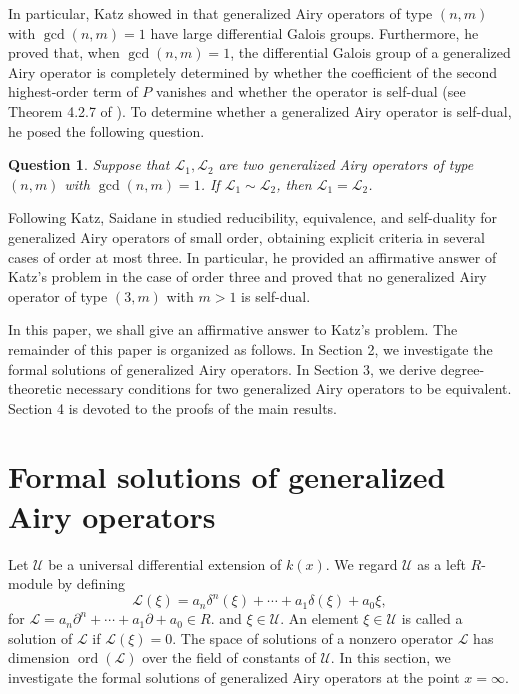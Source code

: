 \documentclass{article}
\newtheorem{question}[theorem]{Question}
\DeclareMathOperator{\ord}{ord}
\newcommand{\calL}{{\mathcal{L}}}
\newcommand{\calU}{{\mathcal{U}}}
\begin{document}
In particular, Katz showed in \cite{Katz:calculationofdifferentialGaloisgroups} that generalized Airy operators of type $(n,m)$ 
with $\gcd(n,m)=1$ have large differential Galois groups. Furthermore, he proved that, when $\gcd(n,m)=1$, 
the differential Galois group of a generalized Airy operator is completely determined by 
whether the coefficient of the second highest-order term of $P$ vanishes and whether the operator is self-dual (see Theorem 4.2.7 of 
\cite{Katz:calculationofdifferentialGaloisgroups}). 
To determine whether a generalized Airy operator is self-dual, he posed the following question. 
\begin{question}
\label{Ques:Katz}
Suppose that $\calL_1,\calL_2$ are two generalized Airy operators of type $(n,m)$ with $\gcd(n,m)=1$. 
If $\calL_1\sim \calL_2$, then $\calL_1=\calL_2$.
\end{question}
Following Katz, Saidane in \cite{Saidane:airyoperatorsofsmallorder} studied reducibility, equivalence, and self-duality for generalized
Airy operators of small order, obtaining explicit criteria in several cases of order at
most three. In particular, he provided an affirmative answer of Katz's problem in the case of order three and proved that no generalized Airy
operator of type $(3, m)$ with $m>1$ is self-dual.

In this paper, we shall give an affirmative answer to Katz's problem. 
The remainder of this paper is organized as follows. 
In Section 2, we investigate the formal solutions of generalized Airy operators. 
In Section 3, we derive degree-theoretic necessary conditions for two generalized
Airy operators to be equivalent. Section 4 is devoted to the proofs of the main results.

\section{Formal solutions of generalized Airy operators}
Let $\calU$ be a universal differential extension of $k(x)$. We regard $\calU$ as a left $R$-module by defining
$$
\calL(\xi)=a_n\delta^n(\xi)+\cdots+a_1\delta(\xi)+a_0\xi,
$$
for
$
\calL=a_n\partial^n+\cdots+a_1\partial+a_0\in R.
$
and $\xi\in \calU$.
An element $\xi\in\calU$ is called a solution of $\calL$ if
$
\calL(\xi)=0.
$
The space of solutions of a nonzero operator $\calL$ has dimension $\ord(\calL)$ over the field of constants of $\calU$.
In this section, we investigate the formal solutions of generalized Airy operators at the point $x=\infty$. 
\end{document}
